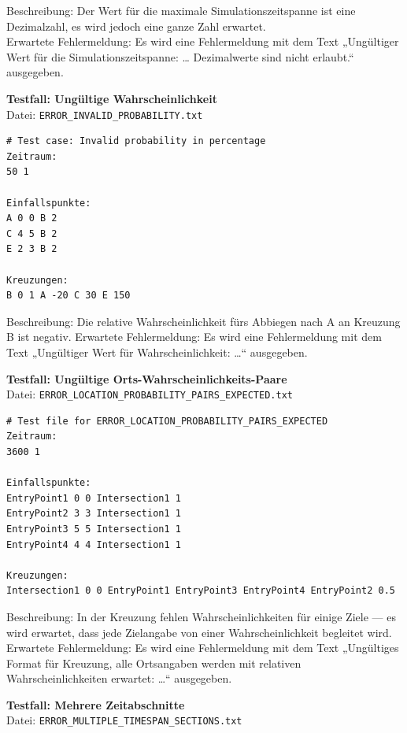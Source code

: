Beschreibung: Der Wert für die maximale Simulationszeitspanne ist eine Dezimalzahl, es wird jedoch eine ganze Zahl erwartet. \\
Erwartete Fehlermeldung: Es wird eine Fehlermeldung mit dem Text „Ungültiger Wert für die Simulationszeitspanne: … Dezimalwerte sind nicht erlaubt.“ ausgegeben.

\clearpage

\textbf{Testfall: Ungültige Wahrscheinlichkeit} \\
Datei: \texttt{ERROR\_INVALID\_PROBABILITY.txt}

\begin{lstlisting}
# Test case: Invalid probability in percentage
Zeitraum:
50 1

Einfallspunkte:
A 0 0 B 2
C 4 5 B 2
E 2 3 B 2

Kreuzungen:
B 0 1 A -20 C 30 E 150
\end{lstlisting}

Beschreibung: Die relative Wahrscheinlichkeit fürs Abbiegen nach A an Kreuzung B ist negativ.
Erwartete Fehlermeldung: Es wird eine Fehlermeldung mit dem Text „Ungültiger Wert für Wahrscheinlichkeit: …“ ausgegeben.

\textbf{Testfall: Ungültige Orts-Wahrscheinlichkeits-Paare} \\
Datei: \texttt{ERROR\_LOCATION\_PROBABILITY\_PAIRS\_EXPECTED.txt}

\begin{lstlisting}
# Test file for ERROR_LOCATION_PROBABILITY_PAIRS_EXPECTED
Zeitraum:
3600 1

Einfallspunkte:
EntryPoint1 0 0 Intersection1 1
EntryPoint2 3 3 Intersection1 1
EntryPoint3 5 5 Intersection1 1
EntryPoint4 4 4 Intersection1 1

Kreuzungen:
Intersection1 0 0 EntryPoint1 EntryPoint3 EntryPoint4 EntryPoint2 0.5
\end{lstlisting}

Beschreibung: In der Kreuzung fehlen Wahrscheinlichkeiten für einige Ziele — es wird erwartet, dass jede Zielangabe von einer Wahrscheinlichkeit begleitet wird. \\
Erwartete Fehlermeldung: Es wird eine Fehlermeldung mit dem Text „Ungültiges Format für Kreuzung, alle Ortsangaben werden mit relativen Wahrscheinlichkeiten erwartet: …“ ausgegeben.

\clearpage

\textbf{Testfall: Mehrere Zeitabschnitte} \\
Datei: \texttt{ERROR\_MULTIPLE\_TIMESPAN\_SECTIONS.txt}

